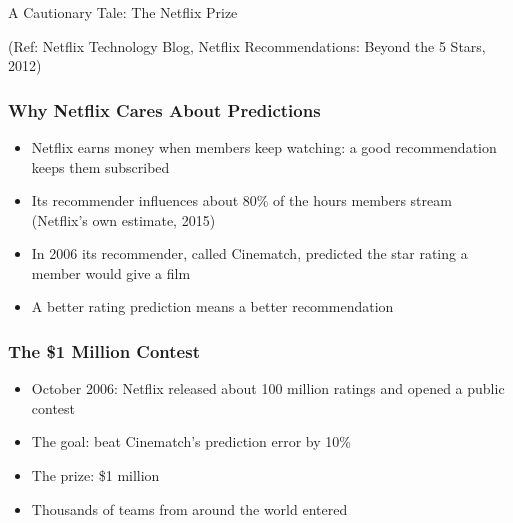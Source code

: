 \begin{frame}[fragile]\frametitle{}
\begin{center}
{\Large A Cautionary Tale: The Netflix Prize}

{\tiny (Ref: Netflix Technology Blog, Netflix Recommendations: Beyond the 5 Stars, 2012)}
\end{center}
\end{frame}

\begin{frame}[fragile]\frametitle{Why Netflix Cares About Predictions}
\begin{itemize}
\item Netflix earns money when members keep watching: a good recommendation keeps them subscribed
\item Its recommender influences about 80\% of the hours members stream (Netflix's own estimate, 2015)
\item In 2006 its recommender, called Cinematch, predicted the star rating a member would give a film
\item A better rating prediction means a better recommendation
\end{itemize}
\end{frame}

\begin{frame}[fragile]\frametitle{The \$1 Million Contest}
\begin{itemize}
\item October 2006: Netflix released about 100 million ratings and opened a public contest
\item The goal: beat Cinematch's prediction error by 10\%
\item The prize: \$1 million
\item Thousands of teams from around the world entered
\end{itemize}
\end{frame}

